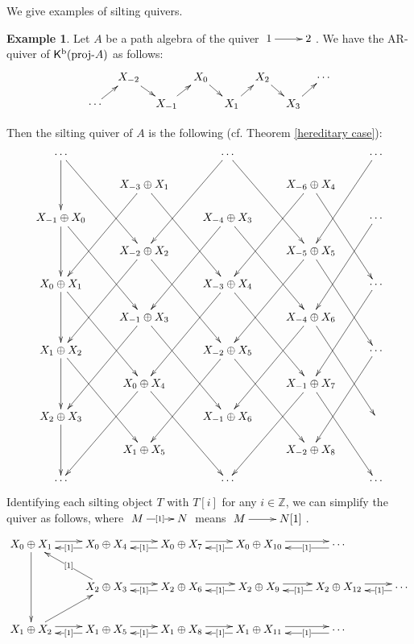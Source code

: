 \documentclass[a4paper,reqno]{amsart}
\theoremstyle{definition}
\newtheorem{example}[theorem]{Example}
\newcommand{\Z}{\mathbb{Z}}
\newcommand{\proj}[1]{{\rm{proj}}\text{-}#1} %
\newcommand{\K}{\mathsf{K}}
\begin{document}
We give examples of silting quivers.

\begin{example}
Let $A$ be a path algebra of the quiver $\xymatrix{1\ar[r]&2}$. 
We have the AR-quiver of $\K^{\rm b}(\proj{A})$ as follows:
\[\xymatrix@R.3cm@C.3cm{
& X_{-2} \ar[dr] &                & X_{0} \ar[dr] &               & X_{2} \ar[dr] & &\cdots\\
\cdots\ar[ur]&                & X_{-1} \ar[ur] &               & X_{1} \ar[ur] &               & X_3\ar[ur]
}\]

Then the silting quiver of $A$ is the following (cf. Theorem \ref{hereditary case}):
\[
\xymatrix@R=0.5cm{
\cdots\ar[dd]\ar[rddd]&&\cdots\ar[lddd]\ar[rddd]&&\cdots\ar[lddd]\\
&X_{-3}\oplus X_1\ar[lddd]\ar[rddd]&&X_{-6}\oplus X_4\ar[lddd]\ar[rddd]&\\
X_{-1}\oplus X_0\ar[dd]\ar[rddd]&&X_{-4}\oplus X_3\ar[lddd]\ar[rddd]&&\cdots\ar[lddd]\\
&X_{-2}\oplus X_2\ar[lddd]\ar[rddd]&&X_{-5}\oplus X_5\ar[lddd]\ar[rddd]&\\
X_0\oplus X_1\ar[dd]\ar[rddd]&&X_{-3}\oplus X_4\ar[lddd]\ar[rddd]&&\cdots\ar[lddd]\\
&X_{-1}\oplus X_3\ar[lddd]\ar[rddd]&&X_{-4}\oplus X_6\ar[lddd]\ar[rddd]&\\
X_1\oplus X_2\ar[dd]\ar[rddd]&&X_{-2}\oplus X_5\ar[lddd]\ar[rddd]&&\cdots\ar[lddd]\\
&X_0\oplus X_4\ar[lddd]\ar[rddd]&&X_{-1}\oplus X_7\ar[lddd]\ar[rddd]&\\
X_2\oplus X_3\ar[dd]&&X_{-1}\oplus X_6&&\\
&X_1\oplus X_5&&X_{-2}\oplus X_8&\\
\cdots &&\cdots&&\cdots
}
\]
Identifying each silting object $T$ with $T[i]$ for any $i\in\Z$, we can simplify the quiver as follows,
where $\xymatrix{M\ar[r]|{[1]}&N}$ means $\xymatrix{M\ar[r]&N[1]}$.
\[
\xymatrix{
X_0\oplus X_1\ar[dd]\ar@<.3em>[r]&X_0\oplus X_4\ar@<.3em>[r]\ar@<.3em>[l]|{[1]}&X_0\oplus X_7\ar@<.3em>[r]\ar@<.3em>[l]|{[1]}
&X_0\oplus X_{10}\ar@<.3em>[r]\ar@<.3em>[l]|{[1]}&\cdots\ar@<.3em>[l]|(0.4){[1]}\\
&X_2\oplus X_3\ar[lu]|{[1]}\ar@<.3em>[r]&X_2\oplus X_6\ar@<.3em>[r]\ar@<.3em>[l]|{[1]}
&X_2\oplus X_9\ar@<.3em>[r]\ar@<.3em>[l]|{[1]}&X_2\oplus X_{12}\ar@<.3em>[r]\ar@<.3em>[l]|{[1]}&\cdots\ar@<.3em>[l]|(0.35){[1]}\\
X_1\oplus X_2\ar[ru]\ar@<.3em>[r]&X_1\oplus X_5\ar@<.3em>[r]\ar@<.3em>[l]|{[1]}&X_1\oplus X_8\ar@<.3em>[r]\ar@<.3em>[l]|{[1]}
&X_1\oplus X_{11}\ar@<.3em>[r]\ar@<.3em>[l]|{[1]}&\cdots\ar@<.3em>[l]|(0.4){[1]}
}
\]
\end{example}
\end{document}
